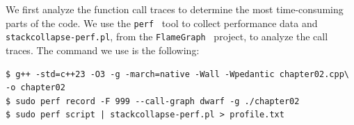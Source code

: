 \documentclass[12pt,a4paper,twoside,openright]{book}
\begin{document}

We first analyze the function call traces to determine the most time-consuming parts of the code. We use the \texttt{perf}~\cite{perf} tool to collect performance data and \texttt{stackcollapse-perf.pl}, from the \texttt{FlameGraph}~\cite{flamegraph} project, to analyze the call traces. The command we use is the following:

\begin{mdframed}[skipabove=\baselineskip,skipbelow=0pt,hidealllines=true,backgroundcolor=black!3,innerleftmargin=10pt,innerrightmargin=5pt,innertopmargin=0pt,innerbottommargin=5pt]
{\small
\begin{verbatim}
$ g++ -std=c++23 -O3 -g -march=native -Wall -Wpedantic chapter02.cpp\
-o chapter02
$ sudo perf record -F 999 --call-graph dwarf -g ./chapter02
$ sudo perf script | stackcollapse-perf.pl > profile.txt
\end{verbatim}
}
\end{mdframed}

\end{document}
